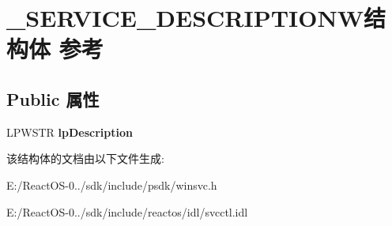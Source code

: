\hypertarget{struct___s_e_r_v_i_c_e___d_e_s_c_r_i_p_t_i_o_n_w}{}\section{\+\_\+\+S\+E\+R\+V\+I\+C\+E\+\_\+\+D\+E\+S\+C\+R\+I\+P\+T\+I\+O\+N\+W结构体 参考}
\label{struct___s_e_r_v_i_c_e___d_e_s_c_r_i_p_t_i_o_n_w}
\subsection*{Public 属性}
\begin{DoxyCompactItemize}
\item 
\mbox{\label{struct___s_e_r_v_i_c_e___d_e_s_c_r_i_p_t_i_o_n_w_a6cf1cb8ac3bcf3990530bcc7e59957b5}} 
L\+P\+W\+S\+TR {\bfseries lp\+Description}
\end{DoxyCompactItemize}


该结构体的文档由以下文件生成\+:\begin{DoxyCompactItemize}
\item 
E\+:/\+React\+O\+S-\/0../sdk/include/psdk/winsvc.\+h\item 
E\+:/\+React\+O\+S-\/0../sdk/include/reactos/idl/svcctl.\+idl\end{DoxyCompactItemize}

